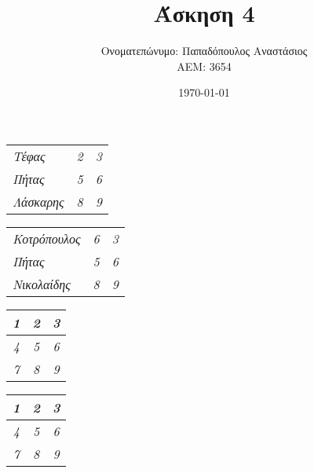 \documentclass{article}
\title{Άσκηση 4}
\author{Ονοματεπώνυμο: Παπαδόπουλος Αναστάσιος \\ 
        ΑΕΜ: 3654}
\date{\today}
\begin{document}
    \maketitle

    \begin{center}
        \begin{tabular}{ l r r }
            \emph{Τέφας} & \emph{2} & \emph{3} \\
            \emph{Πήτας} & \emph{5} & \emph{6} \\
            \emph{Λάσκαρης} & \emph{8} & \emph{9} 
        \end{tabular}

        \vspace{10mm}
        \begin{tabular}{ | l | l | l | }
            \emph{Κοτρόπουλος} & \emph{6} & \emph{3} \\
            \emph{Πήτας} & \emph{5} & \emph{6} \\
            \emph{Νικολαίδης} & \emph{8} & \emph{9} 
        \end{tabular}
        
        \vspace{10mm}
        \begin{tabular}{ | c | c | c | }
            \hline
            \emph{1} & \emph{2} & \emph{3} \\ \hline
            \emph{4} & \emph{5} & \emph{6} \\ \hline
            \emph{7} & \emph{8} & \emph{9} \\
            \hline
        \end{tabular}

        \vspace{10mm}
        \begin{tabular}{ | c | c | c | }
            \hline
            \emph{1} & \emph{2} & \emph{3} \\ \hline
            \emph{4} & \emph{5} & \emph{6} \\ \hline
            \emph{7} & \emph{8} & \emph{9} \\
            \hline
        \end{tabular}


\end{center}
\end{document}
